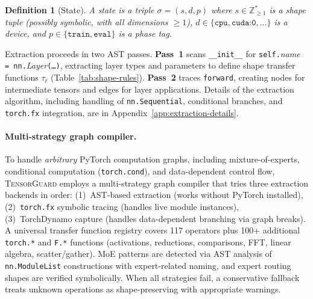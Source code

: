 \documentclass[11pt]{article}
\newtheorem{definition}[theorem]{Definition}
\begin{document}
\begin{definition}[State]\label{def:state}
A \emph{state} is a triple $\sigma = (s, d, p)$ where
$s \in \mathbb{Z}_{\geq 1}^*$ is a shape tuple (possibly symbolic, with all dimensions $\geq 1$),
$d \in \{\texttt{cpu}, \texttt{cuda:0}, \ldots\}$ is a device, and
$p \in \{\texttt{train}, \texttt{eval}\}$ is a phase tag.
\end{definition}

Extraction proceeds in two AST passes.
\textbf{Pass~1} scans \texttt{\_\_init\_\_} for
\texttt{self.}\textit{name}\texttt{ = nn.}\textit{Layer}\texttt{(\ldots)},
extracting layer types and parameters to define shape transfer functions
$\tau_\ell$ (Table~\ref{tab:shape-rules}).
\textbf{Pass~2} traces \texttt{forward}, creating nodes for intermediate
tensors and edges for layer applications.
Details of the extraction algorithm, including handling of
\texttt{nn.Sequential}, conditional branches, and \texttt{torch.fx}
integration, are in Appendix~\ref{app:extraction-details}.

\paragraph{Multi-strategy graph compiler.}
To handle \emph{arbitrary} PyTorch computation graphs, including
mixture-of-experts, conditional computation (\texttt{torch.cond}),
and data-dependent control flow, \textsc{TensorGuard} employs a
multi-strategy graph compiler that tries three extraction backends
in order: (1)~AST-based extraction (works without PyTorch installed),
(2)~\texttt{torch.fx} symbolic tracing (handles live module instances),
(3)~TorchDynamo capture (handles data-dependent branching via graph
breaks).  A universal transfer function registry covers 117 operators
plus 100+ additional \texttt{torch.*} and \texttt{F.*} functions
(activations, reductions, comparisons, FFT, linear algebra, scatter/gather).
MoE patterns are detected via AST analysis of \texttt{nn.ModuleList}
constructions with expert-related naming, and expert routing shapes
are verified symbolically.  When all strategies fail, a conservative
fallback treats unknown operations as shape-preserving with appropriate
warnings.
\end{document}

